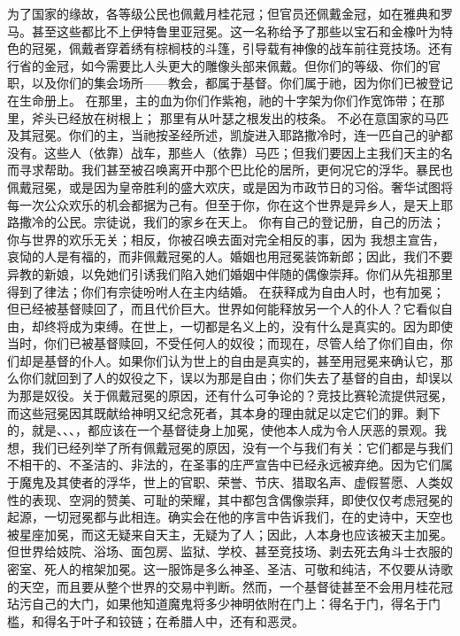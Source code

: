 为了国家的缘故，各等级公民也佩戴月桂花冠；但官员还佩戴金冠，如在雅典和罗马。甚至这些都比不上伊特鲁里亚冠冕。这一名称给予了那些以宝石和金橡叶为特色的冠冕，佩戴者穿着绣有棕榈枝的斗篷，引导载有神像的战车前往竞技场。还有行省的金冠，如今需要比人头更大的雕像头部来佩戴。但你们的等级、你们的官职，以及你们的集会场所——教会，都属于基督。你们属于祂，因为你们已被登记在生命册上。 在那里，主的血为你们作紫袍，祂的十字架为你们作宽饰带；在那里，斧头已经放在树根上； 那里有从叶瑟之根发出的枝条。 不必在意国家的马匹及其冠冕。你们的主，当祂按圣经所述，凯旋进入耶路撒冷时，连一匹自己的驴都没有。这些人（依靠）战车，那些人（依靠）马匹；但我们要因上主我们天主的名而寻求帮助。我们甚至被召唤离开中那个巴比伦的居所，更何况它的浮华。暴民也佩戴冠冕，或是因为皇帝胜利的盛大欢庆，或是因为市政节日的习俗。奢华试图将每一次公众欢乐的机会都据为己有。但至于你，你在这个世界是异乡人，是天上耶路撒冷的公民。宗徒说，我们的家乡在天上。 你有自己的登记册，自己的历法；你与世界的欢乐无关；相反，你被召唤去面对完全相反的事，因为 我想主宣告，哀恸的人是有福的，而非佩戴冠冕的人。婚姻也用冠冕装饰新郎；因此，我们不要异教的新娘，以免她们引诱我们陷入她们婚姻中伴随的偶像崇拜。你们从先祖那里得到了律法；你们有宗徒吩咐人在主内结婚。 在获释成为自由人时，也有加冕；但已经被基督赎回了，而且代价巨大。世界如何能释放另一个人的仆人？它看似自由，却终将成为束缚。在世上，一切都是名义上的，没有什么是真实的。因为即使当时，你们已被基督赎回，不受任何人的奴役；而现在，尽管人给了你们自由，你们却是基督的仆人。如果你们认为世上的自由是真实的，甚至用冠冕来确认它，那么你们就回到了人的奴役之下，误以为那是自由；你们失去了基督的自由，却误以为那是奴役。关于佩戴冠冕的原因，还有什么可争论的？竞技比赛轮流提供冠冕，而这些冠冕因其既献给神明又纪念死者，其本身的理由就足以定它们的罪。剩下的，就是、、、，都应该在一个基督徒身上加冕，使他本人成为令人厌恶的景观。我想，我们已经列举了所有佩戴冠冕的原因，没有一个与我们有关：它们都是与我们不相干的、不圣洁的、非法的，在圣事的庄严宣告中已经永远被弃绝。因为它们属于魔鬼及其使者的浮华，世上的官职、荣誉、节庆、猎取名声、虚假誓愿、人类奴性的表现、空洞的赞美、可耻的荣耀，其中都包含偶像崇拜，即使仅仅考虑冠冕的起源，一切冠冕都与此相连。确实会在他的序言中告诉我们，在的史诗中，天空也被星座加冕，而这无疑来自天主，无疑为了人；因此，人本身也应该被天主加冕。但世界给妓院、浴场、面包房、监狱、学校、甚至竞技场、剥去死去角斗士衣服的密室、死人的棺架加冕。这一服饰是多么神圣、圣洁、可敬和纯洁，不仅要从诗歌的天空，而且要从整个世界的交易中判断。然而，一个基督徒甚至不会用月桂花冠玷污自己的大门，如果他知道魔鬼将多少神明依附在门上：得名于门，得名于门槛，和得名于叶子和铰链；在希腊人中，还有和恶灵。\par

